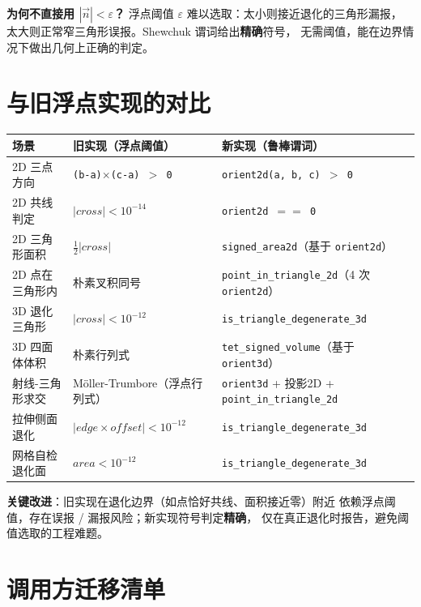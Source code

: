 \documentclass[11pt,a4paper]{article}
\begin{document}
\textbf{为何不直接用 $|\vec{n}| < \varepsilon$？}
浮点阈值 $\varepsilon$ 难以选取：太小则接近退化的三角形漏报，
太大则正常窄三角形误报。Shewchuk 谓词给出\textbf{精确}符号，
无需阈值，能在边界情况下做出几何上正确的判定。

\section{与旧浮点实现的对比}

\begin{center}
\renewcommand{\arraystretch}{1.20}
\begin{tabular}{@{}lll@{}}
  \toprule
  \textbf{场景} & \textbf{旧实现（浮点阈值）} & \textbf{新实现（鲁棒谓词）} \\
  \midrule
  2D 三点方向      & \texttt{(b-a)$\times$(c-a) $>$ 0}              & \texttt{orient2d(a, b, c) $>$ 0} \\
  2D 共线判定      & $|cross| < 10^{-14}$                            & \texttt{orient2d $==$ 0} \\
  2D 三角形面积    & $\tfrac{1}{2}|cross|$                           & \texttt{signed\_area2d}（基于 \texttt{orient2d}） \\
  2D 点在三角形内  & 朴素叉积同号                                    & \texttt{point\_in\_triangle\_2d}（4 次 \texttt{orient2d}） \\
  3D 退化三角形    & $|cross| < 10^{-12}$                            & \texttt{is\_triangle\_degenerate\_3d} \\
  3D 四面体体积    & 朴素行列式                                      & \texttt{tet\_signed\_volume}（基于 \texttt{orient3d}） \\
  射线-三角形求交  & Möller-Trumbore（浮点行列式）                   & \texttt{orient3d} + 投影2D + \texttt{point\_in\_triangle\_2d} \\
  拉伸侧面退化     & $|edge \times offset| < 10^{-12}$               & \texttt{is\_triangle\_degenerate\_3d} \\
  网格自检退化面   & $area < 10^{-12}$                               & \texttt{is\_triangle\_degenerate\_3d} \\
  \bottomrule
\end{tabular}
\end{center}

\textbf{关键改进}：旧实现在退化边界（如点恰好共线、面积接近零）附近
依赖浮点阈值，存在误报 / 漏报风险；新实现符号判定\textbf{精确}，
仅在真正退化时报告，避免阈值选取的工程难题。

\section{调用方迁移清单}
\end{document}

